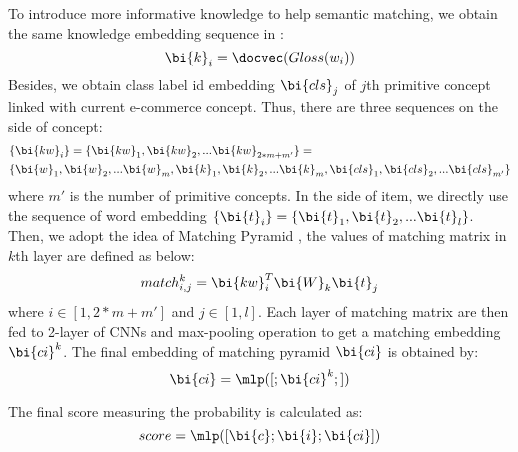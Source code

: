 To introduce more informative knowledge to help semantic matching,
we obtain the same knowledge embedding sequence in :
\begin{equation}
	\bi{k}_i = \docvec(Gloss(w_i))
\end{equation}
Besides, we obtain class label id embedding $\bi{cls}_j$
of $j$th primitive concept linked with current e-commerce concept.
Thus, there are three sequences on the side of concept:
\begin{eqnarray*}
& \{\bi{kw}_i\} = \{\bi{kw}_1,\bi{kw}_2,...\bi{kw}_{2*m+m'}\} = \\
& \{\bi{w}_1,\bi{w}_2,...\bi{w}_m,\bi{k}_1,\bi{k}_2,...\bi{k}_m,\bi{cls}_1,\bi{cls}_2,...\bi{cls}_{m'}\}
\end{eqnarray*}
where $m'$ is the number of primitive concepts.
In the side of item, we directly use the sequence of word embedding $\{\bi{t}_i\} = \{\bi{t}_1, \bi{t}_2,...\bi{t}_l\}$.
Then, we adopt the idea of Matching Pyramid \cite{pang2016text}, 
the values of matching matrix in $k$th layer are defined as below:
\begin{equation}
	match_{i,j}^k = \bi{kw}_i^{T}\bi{W}_k\bi{t}_j
\end{equation}
where $i \in [1, 2*m+m']$ and $j \in [1, l]$.
Each layer of matching matrix are then fed to 2-layer of CNNs and max-pooling operation to get a matching embedding $\bi{ci}^k$.
The final embedding of matching pyramid $\bi{ci}$ is obtained by:
\begin{equation}
\bi{ci} = \mlp([;\bi{ci}^k;])
\end{equation}

The final score measuring the probability is calculated as:
\begin{equation}
	score = \mlp([\bi{c};\bi{i};\bi{ci}])
\end{equation}







